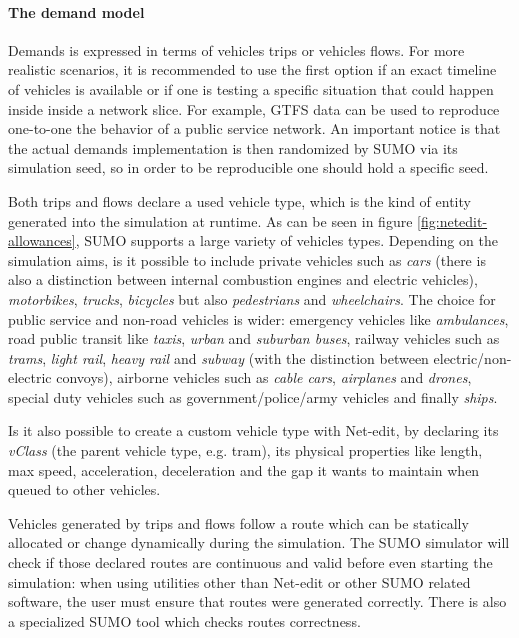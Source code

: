 \paragraph{The demand model}

Demands is expressed in terms of vehicles trips or vehicles flows. For more realistic scenarios, it is recommended to use the first option if an exact timeline of vehicles is available or if one is testing a specific situation that could happen inside inside a network slice. For example, GTFS data can be used to reproduce one-to-one the behavior of a public service network. An important notice is that the actual demands implementation is then randomized by SUMO via its simulation seed, so in order to be reproducible one should hold a specific seed.

Both trips and flows declare a used vehicle type, which is the kind of entity generated into the simulation at runtime. As can be seen in figure \ref{fig:netedit-allowances}, SUMO supports a large variety of vehicles types. Depending on the simulation aims, is it possible to include private vehicles such as \textit{cars} (there is also a distinction between internal combustion engines and electric vehicles), \textit{motorbikes}, \textit{trucks}, \textit{bicycles} but also \textit{pedestrians} and \textit{wheelchairs}. The choice for public service and non-road vehicles is wider: emergency vehicles like \textit{ambulances}, road public transit like \textit{taxis}, \textit{urban} and \textit{suburban buses}, railway vehicles such as \textit{trams}, \textit{light rail}, \textit{heavy rail} and \textit{subway} (with the distinction between electric/non-electric convoys), airborne vehicles such as \textit{cable cars}, \textit{airplanes} and \textit{drones}, special duty vehicles such as government/police/army vehicles and finally \textit{ships}.

Is it also possible to create a custom vehicle type with Net-edit, by declaring its \textit{vClass} (the parent vehicle type, e.g. tram), its physical properties like length, max speed, acceleration, deceleration and the gap it wants to maintain when queued to other vehicles.

Vehicles generated by trips and flows follow a route which can be statically allocated or change dynamically during the simulation. The SUMO simulator will check if those declared routes are continuous and valid before even starting the simulation: when using utilities other than Net-edit or other SUMO related software, the user must ensure that routes were generated correctly. There is also a specialized SUMO tool which checks routes correctness.

